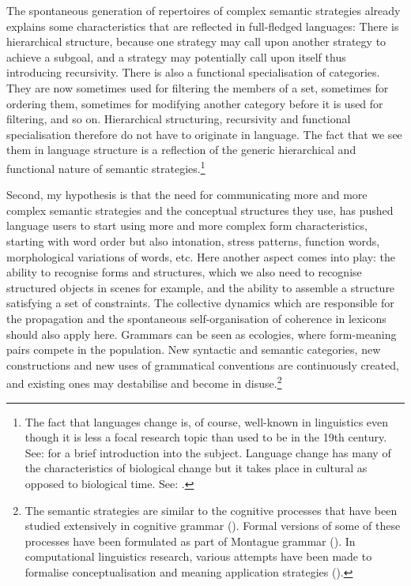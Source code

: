 The spontaneous generation of repertoires of complex 
semantic strategies already explains some characteristics 
that are reflected in full-fledged languages: 
There is hierarchical structure, because one strategy 
may call upon another strategy to achieve a subgoal, 
and a strategy may potentially call upon itself thus introducing 
recursivity. There is also a functional specialisation
of categories. They are now sometimes used for filtering
the members of a set, sometimes for ordering them, sometimes
for modifying another category before it is used for 
filtering, and so on. Hierarchical structuring, recursivity
and functional specialisation therefore do not have to 
originate in language. The fact that we see them in 
language structure is a reflection of the generic 
hierarchical and functional nature 
of semantic strategies.\footnote{
The fact that languages change is, of course, 
well-known in linguistics even though it is less a focal 
research topic than used to be in the 19th century. 
See: \cite{McMahon:1994} for a brief introduction into the 
subject. Language change has many of the characteristics
of biological change but it takes place in cultural 
as opposed to biological time. See: \cite{Labov:1994}.}

Second, my hypothesis is that the need for communicating 
more and more complex semantic strategies and the 
conceptual structures they use, has pushed language 
users to start using more and more complex form characteristics, 
starting with word order but also intonation, stress 
patterns, function words, morphological variations of words, 
etc. Here another aspect comes into 
play: the ability to recognise forms and structures, 
which we also need to recognise structured objects in 
scenes for example, and the ability to assemble a 
structure satisfying a set of constraints. The collective
dynamics which are responsible for the propagation and the spontaneous 
self-organisation of coherence in lexicons should also apply  
here. Grammars can be seen as ecologies, where
form-meaning pairs compete in the population. New 
syntactic and semantic categories, new constructions and 
new uses of grammatical conventions are continuously created,
and existing ones may destabilise and become
in disuse.\footnote{
The semantic strategies are similar to the 
cognitive processes that have been studied extensively 
in cognitive grammar (\citealt{Langacker:1987}). Formal versions
of some of these processes have been formulated as 
part of Montague grammar (\citealt{Montague:1974}). In 
computational linguistics research, various 
attempts have been made to formalise conceptualisation
and meaning application strategies (\citealt{Gazdar:1989}).}

